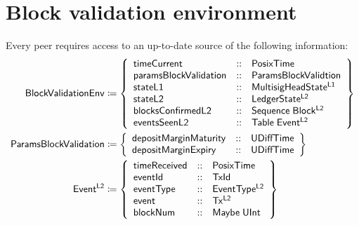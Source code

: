 \documentclass[../hydrozoa.tex]{subfiles}
\begin{document}
\section{Block validation environment}%
\label{h:l2-block-validation-environment}%

Every peer requires access to an up-to-date source of the following information:
\begin{equation*}
\begin{split}
  \mathsf{BlockValidationEnv} &\coloneq \left\{
    \begin{array}{lll}
      \mathsf{timeCurrent} &::& \mathsf{PosixTime} \\
      \mathsf{paramsBlockValidation} &::& \mathsf{ParamsBlockValidtion} \\
      \mathsf{stateL1} &::& \mathsf{MultisigHeadState^{L1}} \\
      \mathsf{stateL2} &::& \mathsf{LedgerState^{L2}} \\
      \mathsf{blocksConfirmedL2} &::& \mathsf{Sequence} \; \mathsf{Block^{L2}} \\
      \mathsf{eventsSeenL2} &::& \mathsf{Table} \; \mathsf{Event^{L2}}
    \end{array}\right\} \\
  \mathsf{ParamsBlockValidation} &\coloneq \left\{
    \begin{array}{lll}
      \mathsf{depositMarginMaturity} &::& \mathsf{UDiffTime} \\
      \mathsf{depositMarginExpiry} &::& \mathsf{UDiffTime}
    \end{array}\right\} \\
  \mathsf{Event^{L2}} &\coloneq \left\{
    \begin{array}{lll}
      \mathsf{timeReceived} &::& \mathsf{PosixTime} \\
      \mathsf{eventId} &::& \mathsf{TxId} \\
      \mathsf{eventType} &::& \mathsf{EventType^{L2}} \\
      \mathsf{event} &::& \mathsf{Tx^{L2}} \\
      \mathsf{blockNum} &::& \mathsf{Maybe} \; \mathsf{UInt}
    \end{array}\right\} \\
\end{split}
\end{equation*}
\end{document}

